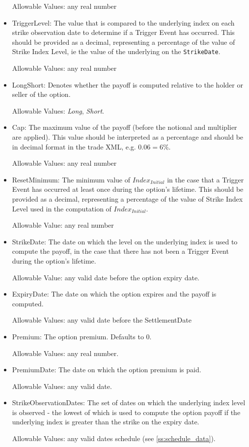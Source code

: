 \begin{itemize}
  Allowable Values: any real number

\item TriggerLevel: The value that is compared to the underlying index on each strike observation date to determine if a Trigger Event has occurred. This should be provided as a decimal, representing a percentage of the value of Strike Index Level, ie the value of the underlying on the \lstinline!StrikeDate!.

  Allowable Values: any real number

\item LongShort: Denotes whether the payoff is computed relative to the holder or seller of the option.  

  Allowable Values: \emph{Long}, \emph{Short}.

\item Cap: The maximum value of the payoff (before the notional and multiplier are applied). This value should be interpreted as a percentage and should be in decimal format in the trade XML, e.g. $0.06 = 6\%$.

  Allowable Values: any real number

\item ResetMinimum: The minimum value of $Index_{Initial}$ in the case that a Trigger Event has occurred at least once during the option's lifetime. This should be provided as a decimal, representing a percentage of the value of Strike Index Level used in the computation of $Index_{Initial}$.

  Allowable Value: any real number

\item StrikeDate: The date on which the level on the underlying index is used to compute the payoff, in the case that there has not been a Trigger Event during the option's lifetime.

  Allowable Value: any valid date before the option expiry date.

\item ExpiryDate: The date on which the option expires and the payoff is computed.

  Allowable Values: any valid date before the SettlementDate

\item Premium: The option premium. Defaults to $0$.

  Allowable Values: any real number.

\item PremiumDate: The date on which the option premium is paid.

  Allowable Values: any valid date.

\item StrikeObservationDates: The set of dates on which the underlying index level is observed - the lowest of which is used to compute the option payoff if the underlying index is greater than the strike on the expiry date.

  Allowable Values: any valid dates schedule (see \ref{ss:schedule_data}).




\end{itemize}

